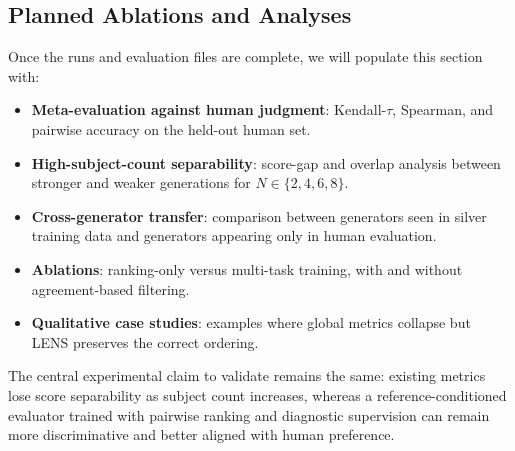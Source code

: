 \subsection{Planned Ablations and Analyses}
Once the runs and evaluation files are complete, we will populate this section with:
\begin{itemize}
    \item \textbf{Meta-evaluation against human judgment}: Kendall-$\tau$, Spearman, and pairwise accuracy on the held-out human set.
    \item \textbf{High-subject-count separability}: score-gap and overlap analysis between stronger and weaker generations for $N \in \{2,4,6,8\}$.
    \item \textbf{Cross-generator transfer}: comparison between generators seen in silver training data and generators appearing only in human evaluation.
    \item \textbf{Ablations}: ranking-only versus multi-task training, with and without agreement-based filtering.
    \item \textbf{Qualitative case studies}: examples where global metrics collapse but LENS preserves the correct ordering.
\end{itemize}

The central experimental claim to validate remains the same: existing metrics lose score separability as subject count increases, whereas a reference-conditioned evaluator trained with pairwise ranking and diagnostic supervision can remain more discriminative and better aligned with human preference.
